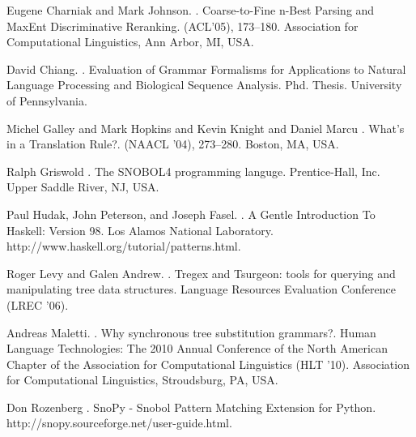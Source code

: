\documentclass[11pt]{article}
\begin{document}
\begin{thebibliography}{}
Eugene Charniak and Mark Johnson.
.
\newblock Coarse-to-Fine n-Best Parsing and MaxEnt Discriminative Reranking.
 (ACL'05), 173--180.
\newblock Association for Computational Linguistics, Ann Arbor, MI, USA.

David Chiang.
.
\newblock Evaluation of Grammar Formalisms for Applications to Natural Language Processing and Biological Sequence Analysis.
\newblock Phd. Thesis.
\newblock University of Pennsylvania.

Michel Galley and Mark Hopkins and Kevin Knight and Daniel Marcu
.
\newblock What's in a Translation Rule?.
 (NAACL '04), 273--280.
\newblock Boston, MA, USA.

Ralph Griswold
.
\newblock The SNOBOL4 programming languge. 
\newblock Prentice-Hall, Inc.
\newblock Upper Saddle River, NJ, USA.


Paul Hudak, John Peterson, and Joseph Fasel.
.
\newblock A Gentle Introduction To Haskell: Version 98.
\newblock Los Alamos National Laboratory. 
\newblock http://www.haskell.org/tutorial/patterns.html.

Roger Levy and Galen Andrew.
.
\newblock Tregex and Tsurgeon: tools for querying and manipulating tree data structures.
\newblock Language Resources Evaluation Conference (LREC '06).

Andreas Maletti.
. 
\newblock Why synchronous tree substitution grammars?.
\newblock Human Language Technologies: The 2010 Annual Conference of the North American Chapter of the Association for Computational Linguistics  (HLT '10).
\newblock Association for Computational Linguistics, Stroudsburg, PA, USA.


Don Rozenberg
.
\newblock SnoPy - Snobol Pattern Matching Extension for Python.
\newblock http://snopy.sourceforge.net/user-guide.html.



\end{thebibliography}
\end{document}
